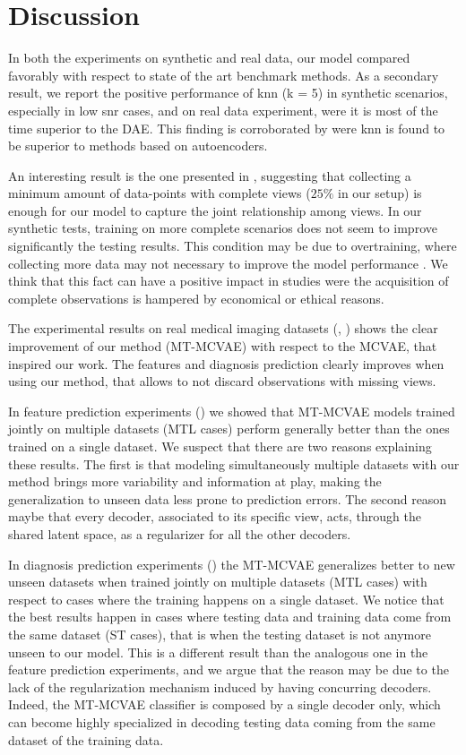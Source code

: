 \section{Discussion}

In both the experiments on synthetic and real data, our model compared favorably with respect to state of the art benchmark methods.
As a secondary result, we report the positive performance of knn (k = 5) in synthetic scenarios, especially in low snr cases, and on real data experiment, were it is most of the time superior to the DAE.
This finding is corroborated by \cite{Platias2020} were knn is found to be superior to methods based on autoencoders.

An interesting result is the one presented in , suggesting that collecting a minimum amount of data-points with complete views ($25\%$ in our setup) is enough for our model to capture the joint relationship among views.
In our synthetic tests, training on more complete scenarios does not seem to improve significantly the testing results.
This condition may be due to overtraining, where collecting more data may not necessary to improve the model performance \citep{Bilbao2017}.
We think that this fact can have a positive impact in studies were the acquisition of complete observations is hampered by economical or ethical reasons.

The experimental results on real medical imaging datasets (, ) shows the clear improvement of our method (MT-MCVAE) with respect to the MCVAE, that inspired our work.
The features and diagnosis prediction clearly improves when using our method, that allows to not discard observations with missing views.

In feature prediction experiments () we showed that MT-MCVAE models trained jointly on multiple datasets (MTL cases) perform generally better than the ones trained on a single dataset.
We suspect that there are two reasons explaining these results.
The first is that modeling simultaneously multiple datasets with our method brings more variability and information at play, making the generalization to unseen data less prone to prediction errors.
The second reason maybe that every decoder, associated to its specific view, acts, through the shared latent space, as a regularizer for all the other decoders.

In diagnosis prediction experiments () the MT-MCVAE generalizes better to new unseen datasets when trained jointly on multiple datasets (MTL cases) with respect to cases where the training happens on a single dataset.
We notice that the best results happen in cases where testing data and training data come from the same dataset (ST cases), that is when the testing dataset is not anymore unseen to our model.
This is a different result than the analogous one in the feature prediction experiments, and we argue that the reason may be due to the lack of the regularization mechanism induced by having concurring decoders.
Indeed, the MT-MCVAE classifier is composed by a single decoder only, which can become highly specialized in decoding testing data coming from the same dataset of the training data.

